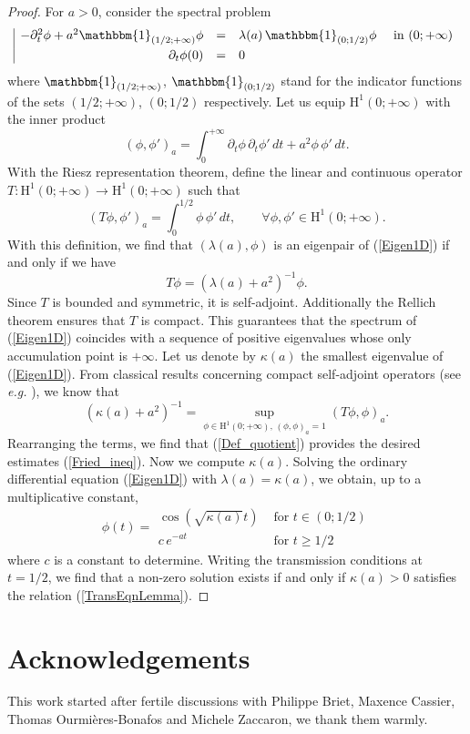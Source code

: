 \documentclass[11pt,a4paper]{article}
\newcommand{\mrm}[1]{\mathrm{#1}}
\newcommand{\mH}{\mrm{H}}
\begin{document}
\begin{proof}
For $a>0$, consider the spectral problem 
\begin{equation}\label{Eigen1D}
\begin{array}{|rcll}
-\partial^2_t \phi+a^2\mathbbm{1}_{(1/2;+\infty)} \phi &=& \lambda(a)\,\mathbbm{1}_{(0;1/2)}\phi&\mbox{ in }(0;+\infty)\\[4pt]
\partial_t\phi(0)&=&0
\end{array}
\end{equation}
where $\mathbbm{1}_{(1/2;+\infty)}$, $\mathbbm{1}_{(0;1/2)}$ stand for the indicator functions of the sets $(1/2;+\infty)$, $(0;1/2)$ respectively. Let us equip $\mH^1(0;+\infty)$ with the inner product
\[
(\phi,\phi')_a=\int_{0}^{+\infty}\partial_t\phi\,\partial_t\phi'\,dt+a^2\phi\,\phi'\,dt.
\]
With the Riesz representation theorem, define the linear and continuous operator $T:\mH^1(0;+\infty)\to \mH^1(0;+\infty)$ such that
\[
(T\phi,\phi')_a=\int_{0}^{1/2}\phi\,\phi'\,dt,\qquad\forall \phi,\phi'\in\mH^1(0;+\infty).
\]
With this definition, we find that $(\lambda(a),\phi)$ is an eigenpair of (\ref{Eigen1D}) if and only if we have 
\[
T\phi=(\lambda(a)+a^2)^{-1}\phi.
\]
Since $T$ is bounded and symmetric, it is self-adjoint. Additionally the Rellich theorem ensures that $T$ is compact. This guarantees that the spectrum of (\ref{Eigen1D}) coincides with a sequence of positive eigenvalues whose only accumulation point is $+\infty$. Let us denote by $\kappa(a)$ the smallest eigenvalue of (\ref{Eigen1D}). From classical results concerning compact self-adjoint operators (see \textit{e.g.} \cite[Thm. 2.7.2]{BiSo87}), we know that
\begin{equation}\label{Def_quotient}
(\kappa(a)+a^2)^{-1}=\underset{\phi\in\mH^1(0;+\infty),\,(\phi,\phi)_a=1}{\sup} (T\phi,\phi)_a.
\end{equation}
Rearranging the terms, we find that (\ref{Def_quotient}) provides the desired estimates (\ref{Fried_ineq}). Now we compute $\kappa(a)$. Solving the ordinary differential equation (\ref{Eigen1D}) with $\lambda(a)=\kappa(a)$, we obtain, up to a multiplicative constant,
\[
\phi(t)=\begin{array}{|ll}
\cos(\sqrt{\kappa(a)}t) & \mbox{ for }t\in(0;1/2)\\[3pt]
c\,e^{-at} & \mbox{ for }t\ge 1/2
\end{array}
\]
where $c$ is a constant to determine. Writing the transmission conditions at $t=1/2$, we find that a non-zero solution exists if and only if $\kappa(a)>0$ satisfies the relation (\ref{TransEqnLemma}).
\end{proof}


\section*{Acknowledgements}

This work started after fertile discussions with Philippe Briet, Maxence Cassier, Thomas Ourmi\`eres-Bonafos and Michele Zaccaron, we thank them warmly.




\end{document}
